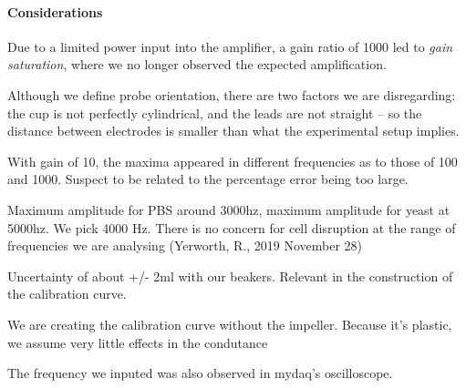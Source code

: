 \paragraph{Considerations}

Due to a limited power input into the amplifier, a gain ratio of 1000 led to \textit{gain saturation}, where we no longer observed the expected amplification.

Although we define probe orientation, there are two factors we are disregarding: the cup is not perfectly cylindrical, and the leads are not straight -- so the distance between electrodes is smaller than what the experimental setup implies.

With gain of 10, the maxima appeared in different frequencies as to those of 100 and 1000.
Suspect to be related to the percentage error being too large.

Maximum amplitude for PBS around 3000hz, maximum amplitude for yeast at 5000hz. We pick 4000 Hz.
There is no concern for cell disruption at the range of frequencies we are analysing (Yerworth, R., 2019 November 28)

Uncertainty of about +/- 2ml with our beakers. Relevant in the construction of the calibration curve.

We are creating the calibration curve without the impeller. Because it's plastic, we assume very little effects in the condutance

The frequency we inputed was also observed in mydaq's oscilloscope. 